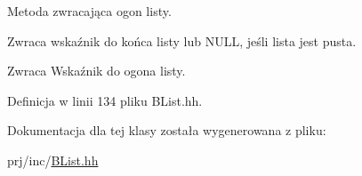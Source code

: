 Metoda zwracająca ogon listy. 

Zwraca wskaźnik do końca listy lub N\-U\-L\-L, jeśli lista jest pusta.

\begin{DoxyReturn}{Zwraca}
Wskaźnik do ogona listy. 
\end{DoxyReturn}


Definicja w linii 134 pliku B\-List.\-hh.



Dokumentacja dla tej klasy została wygenerowana z pliku\-:\begin{DoxyCompactItemize}
\item 
prj/inc/\hyperlink{_b_list_8hh}{B\-List.\-hh}\end{DoxyCompactItemize}
